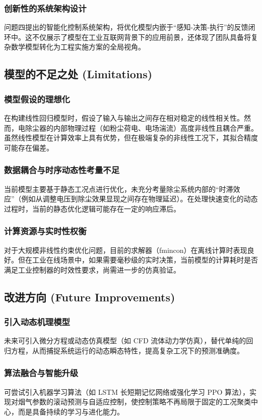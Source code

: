 \documentclass[UTF8, a4paper]{ctexart}
\begin{document}
\subsubsection{创新性的系统架构设计} 问题四提出的智能化控制系统架构，将优化模型内嵌于“感知-决策-执行”的反馈闭环中。这不仅展示了模型在工业互联网背景下的应用前景，还体现了团队具备将复杂数学模型转化为工程实施方案的全局视角。
\subsection{模型的不足之处 (Limitations)}
\subsubsection{模型假设的理想化} 在构建线性回归模型时，假设了输入与输出之间存在相对稳定的线性相关性。然而，电除尘器的内部物理过程（如粉尘荷电、电场湍流）高度非线性且耦合严重。虽然线性模型在计算效率上具有优势，但在极端复杂的非线性工况下，其拟合精度可能存在偏差。
\subsubsection{数据耦合与时序动态性考量不足} 当前模型主要基于静态工况点进行优化，未充分考量除尘系统内部的“时滞效应”（例如从调整电压到除尘效果显现之间存在物理延迟）。在处理快速变化的动态过程时，当前的静态优化逻辑可能存在一定的响应滞后。
\subsubsection{计算资源与实时性权衡} 对于大规模非线性约束优化问题，目前的求解器（fmincon）在离线计算时表现良好。但在工业在线场景中，如果需要毫秒级的实时决策，当前模型的计算耗时是否满足工业控制器的时效性要求，尚需进一步的仿真验证。
\subsection{改进方向 (Future Improvements)}
\subsubsection{引入动态机理模型} 未来可引入微分方程或动态仿真模型（如 CFD 流体动力学仿真），替代单纯的回归方程，从而捕捉系统运行的动态瞬态特性，提高复杂工况下的预测准确度。
\subsubsection{算法融合与智能升级} 可尝试引入机器学习算法（如 LSTM 长短期记忆网络或强化学习 PPO 算法），实现对烟气参数的滚动预测与自适应控制，使控制策略不再局限于固定的工况聚类中心，而是具备持续的学习与进化能力。
\end{document}
